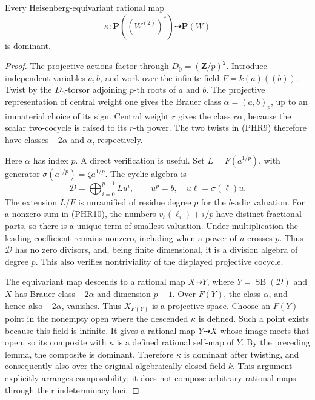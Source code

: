 \begin{lemma}
\label{lem:prime-Heisenberg-projective-dominance}
Every Heisenberg-equivariant rational map
\[
            \kappa:\mathbf P((W^{(2)})^*)\dashrightarrow
                              \mathbf P(W)             \tag{PHR9}
\]
is dominant.
\end{lemma}
\begin{proof}
The projective actions factor through
\(D_0=(\mathbf Z/p)^2\). Introduce independent variables \(a,b\),
and work over the infinite field \(F=k(a)((b))\).
Twist by the \(D_0\)-torsor adjoining \(p\)-th roots of \(a\)
and \(b\). The projective representation of central weight one
gives the Brauer class \(\alpha=(a,b)_p\), up to an immaterial
choice of its sign. Central weight \(r\) gives the class
\(r\alpha\), because the scalar two-cocycle is raised to its
\(r\)-th power. The two twists in (PHR9) therefore have classes
\(-2\alpha\) and \(\alpha\), respectively.

Here \(\alpha\) has index \(p\). A direct verification is useful.
Set \(L=F(a^{1/p})\), with generator
\(\sigma(a^{1/p})=\zeta a^{1/p}\). The cyclic algebra is
\[
 \mathcal D=\bigoplus_{i=0}^{p-1}L u^i,\qquad
       u^p=b,\quad u\ell=\sigma(\ell)u.           \tag{PHR10}
\]
The extension \(L/F\) is unramified of residue degree \(p\)
for the \(b\)-adic valuation. For a nonzero sum in (PHR10),
the numbers \(v_b(\ell_i)+i/p\) have distinct fractional parts,
so there is a unique term of smallest valuation. Under
multiplication the leading coefficient remains nonzero, including
when a power of \(u\) crosses \(p\). Thus \(\mathcal D\) has no
zero divisors, and, being finite dimensional, it is a division
algebra of degree \(p\). This also verifies nontriviality of
the displayed projective cocycle.

The equivariant map descends to a rational map \(X\dashrightarrow
Y\), where \(Y=\operatorname{SB}(\mathcal D)\) and \(X\)
has Brauer class \(-2\alpha\) and dimension \(p-1\).
Over \(F(Y)\), the class \(\alpha\), and hence also \(-2\alpha\),
vanishes. Thus \(X_{F(Y)}\) is a projective space.
Choose an \(F(Y)\)-point in the nonempty open where the descended
\(\kappa\) is defined. Such a point exists because this field is
infinite. It gives a rational map \(Y\dashrightarrow X\) whose
image meets that open, so its composite with \(\kappa\) is a
defined rational self-map of \(Y\).
By the preceding lemma, the composite is dominant. Therefore
\(\kappa\) is dominant after twisting, and consequently also
over the original algebraically closed field \(k\).
This argument explicitly arranges composability; it does not
compose arbitrary rational maps through their indeterminacy loci.
\end{proof}

